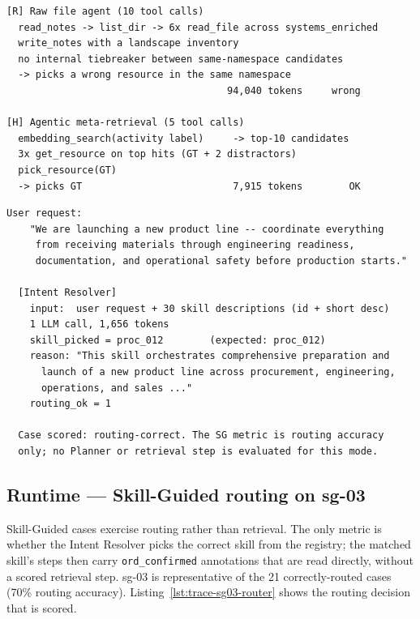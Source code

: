 \begin{lstlisting}
[R] Raw file agent (10 tool calls)
  read_notes -> list_dir -> 6x read_file across systems_enriched
  write_notes with a landscape inventory
  no internal tiebreaker between same-namespace candidates
  -> picks a wrong resource in the same namespace
                                      94,040 tokens     wrong

[H] Agentic meta-retrieval (5 tool calls)
  embedding_search(activity label)     -> top-10 candidates
  3x get_resource on top hits (GT + 2 distractors)
  pick_resource(GT)
  -> picks GT                          7,915 tokens        OK
\end{lstlisting}



\begin{lstlisting}[float=!t, floatplacement=!t, basicstyle=\ttfamily\scriptsize, breaklines=true, frame=single, label={lst:trace-sg03-router}, caption={Routing trace for \texttt{sg-03} (\texttt{results/runtime/skill\_guided/routing/sg-03.json}). Skill-Guided is scored on this decision alone.}]
  User request:
    "We are launching a new product line -- coordinate everything
     from receiving materials through engineering readiness,
     documentation, and operational safety before production starts."

  [Intent Resolver]
    input:  user request + 30 skill descriptions (id + short desc)
    1 LLM call, 1,656 tokens
    skill_picked = proc_012        (expected: proc_012)
    reason: "This skill orchestrates comprehensive preparation and
      launch of a new product line across procurement, engineering,
      operations, and sales ..."
    routing_ok = 1

  Case scored: routing-correct. The SG metric is routing accuracy
  only; no Planner or retrieval step is evaluated for this mode.
  \end{lstlisting}



\subsection{Runtime --- Skill-Guided routing on sg-03}
\label{appendix:trace-rt-sg-03}

Skill-Guided cases exercise routing rather than retrieval. The only metric is whether the Intent Resolver picks the correct skill from the registry; the matched skill's steps then carry \texttt{ord\_confirmed} annotations that are read directly, without a scored retrieval step. sg-03 is representative of the 21 correctly-routed cases (70\% routing accuracy). Listing~\ref{lst:trace-sg03-router} shows the routing decision that is scored.


